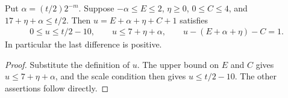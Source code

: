 \begin{lemma}
    \label{thm:soft_truncation_scaled_reverse_cutoff}
    \leanok
    Put $\alpha=(t/2)2^{-m}$. Suppose $-\alpha\leq E\leq2$,
    $\eta\geq0$, $0\leq C\leq4$, and $17+\eta+\alpha\leq t/2$.
    Then $u=E+\alpha+\eta+C+1$ satisfies
    \begin{align*}
        0\leq u\leq t/2-10,\qquad
        u\leq7+\eta+\alpha,\qquad
        u-(E+\alpha+\eta)-C=1.
    \end{align*}
    In particular the last difference is positive.
\end{lemma}
\begin{proof}\leanok
    Substitute the definition of $u$. The upper bound on $E$ and
    $C$ gives $u\leq7+\eta+\alpha$, and the scale condition then
    gives $u\leq t/2-10$. The other assertions follow directly.
\end{proof}
